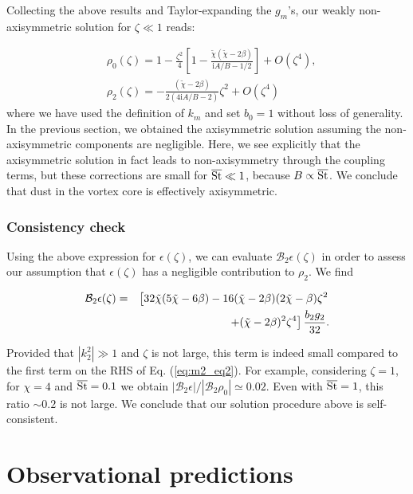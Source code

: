 \documentclass[apj]{emulateapj}
\newcommand{\Eq}[1]{Eq. (\ref{#1})}
\newcommand{\eq}[1]{\Eq{#1}}
\newcommand{\beqn}{\begin{eqnarray}}
\newcommand{\eeqn}{\end{eqnarray}}
\newcommand{\tilchi}{\tilde\chi}
\newcommand{\St}{{\rm St}}
\begin{document}
Collecting the above results and Taylor-expanding the $g_m$'s, our
weakly non-axisymmetric solution for $\zeta\ll 1$ reads:

\begin{align}
&\rho_0(\zeta) =1 -  \frac{\zeta^2}{4}\left[1-\frac{\tilchi\left(\tilchi - 2\beta\right)}{\mathrm{i}A/B - 1/2}\right]+ O(\zeta^4),\\
&\rho_2(\zeta) =-\frac{\left(\tilchi - 2\beta\right)}{2\left(4\mathrm{i}A/B - 2\right)}\zeta^2+O(\zeta^4)
\end{align}
where we have used the definition of $k_m$ and set $b_0=1$
  without loss of generality. %
In the previous section, we obtained the axisymmetric solution
assuming the non-axisymmetric components are negligible. 
Here, we see explicitly that the axisymmetric solution in fact leads
to non-axisymmetry through the coupling terms, but these corrections
are small for $\overline{\St} \ll 1$, because $B \propto \overline{\St}$. We conclude that dust in the vortex core is effectively axisymmetric.

\subsubsection{Consistency check}
Using the above expression for $\epsilon(\zeta)$, we can evaluate
$\mathcal{B}_2\epsilon(\zeta)$ in order to assess our assumption that
$\epsilon(\zeta)$ has a negligible contribution to $\rho_2$. We find

\beqn
\mathcal{B}_2\epsilon(\zeta) =&& \left[32\tilchi(5\tilchi - 6\beta)-16(\tilchi-2\beta)(2\tilchi-\beta)\zeta^2
\right.\notag\\&&\left.+(\tilchi - 2\beta)^2\zeta^4\right]\frac{b_2g_2}{32}.
\eeqn

Provided that $|k_2^2|\gg1$ and $\zeta$ is not large,  
this term is indeed small compared to the first term on the RHS of \eq{eq:m2_eq2}. For example, considering $\zeta=1$, 
for $\chi=4$ and $\overline{\St}=0.1$ we obtain $|\mathcal{B}_2\epsilon|/|\mathcal{B}_2\rho_0|\simeq0.02$. 
Even with $\overline{\St}=1$, this ratio $\sim0.2$ is not large. We
conclude that our solution procedure above is self-consistent.

\section{Observational predictions}
\label{sect:observables}
\end{document}
